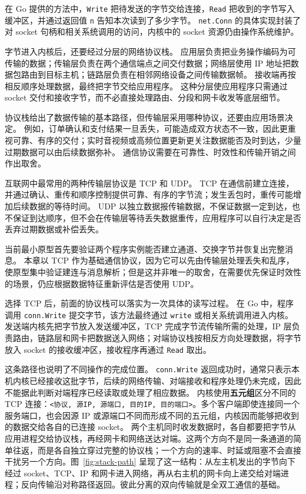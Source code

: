 在 Go 提供的方法中，\texttt{Write} 把待发送的字节交给连接，\texttt{Read} 把收到的字节写入缓冲区，并通过返回值 \texttt{n} 告知本次读到了多少字节。
\texttt{net.Conn} 的具体实现封装了对 socket 句柄和相关系统调用的访问，内核中的 socket 资源仍由操作系统维护。

字节进入内核后，还要经过分层的网络协议栈。
应用层负责把业务操作编码为可传输的数据；传输层负责在两个通信端点之间交付数据；网络层使用 IP 地址把数据包路由到目标主机；链路层负责在相邻网络设备之间传输数据帧。
接收端再按相反顺序处理数据，最终把字节交给应用程序。
这种分层使应用程序只需通过 socket 交付和接收字节，而不必直接处理路由、分段和网卡收发等底层细节。

协议栈给出了数据传输的基本路径，但传输层采用哪种协议，还要由应用场景决定。
例如，订单确认和支付结果一旦丢失，可能造成双方状态不一致，因此更重视可靠、有序的交付；实时音视频或高频位置更新更关注数据能否及时到达，少量过期数据可以由后续数据弥补。
通信协议需要在可靠性、时效性和传输开销之间作出取舍。

互联网中最常用的两种传输层协议是 TCP 和 UDP。
TCP 在通信前建立连接，并通过确认、重传和顺序控制提供可靠、有序的字节流；发生丢包时，重传可能增加后续数据的等待时间。
UDP 以独立数据报传输数据，不保证数据一定到达，也不保证到达顺序，但不会在传输层等待丢失数据重传，应用程序可以自行决定是否丢弃过期数据或补偿丢失。

当前最小原型首先要验证两个程序实例能否建立通道、交换字节并恢复出完整消息。
本章以 TCP 作为基础通信协议，因为它可以先由传输层处理丢失和乱序，使原型集中验证建连与消息解析；但是这并非唯一的取舍，在需要优先保证时效性的场景，仍应根据数据特征重新评估是否使用 UDP。

选择 TCP 后，前面的协议栈可以落实为一次具体的读写过程。
在 Go 中，程序调用 \texttt{conn.Write} 提交字节，该方法最终通过 \texttt{write} 或相关系统调用进入内核。
发送端内核先把字节放入发送缓冲区，TCP 完成字节流传输所需的处理，IP 层负责路由，链路层和网卡把数据送入网络；对端协议栈按相反方向处理数据，将字节放入 socket 的接收缓冲区，接收程序再通过 \texttt{Read} 取出。

这条路径也说明了不同操作的完成位置。
\texttt{conn.Write} 返回成功时，通常只表示本机内核已经接收这批字节，后续的网络传输、对端接收和程序处理仍未完成，因此不能据此判断对端程序已经读取或处理了相应数据。
内核使用\textbf{五元组}区分不同的 TCP 连接：\texttt{<协议, 源IP, 源端口, 目的IP, 目的端口>}。多个客户端即使连接同一个服务端口，也会因源 IP 或源端口不同而形成不同的五元组，内核因而能够把收到的数据交给各自的已连接 socket。
两个主机同时收发数据时，各自都要把字节从应用进程交给协议栈，再经网卡和网络送达对端。这两个方向不是同一条通道的简单往返，而是各自独立穿过完整的协议栈；一个方向的速率、时延或阻塞不会直接干扰另一个方向。图~\ref{fig:stack-path} 呈现了这一结构：从左主机发出的字节向下经过 socket、TCP、IP 和网卡进入网络，再从右主机的网卡向上递交给对端进程；反向传输沿对称路径返回。彼此分离的双向传输就是全双工通信的基础。

